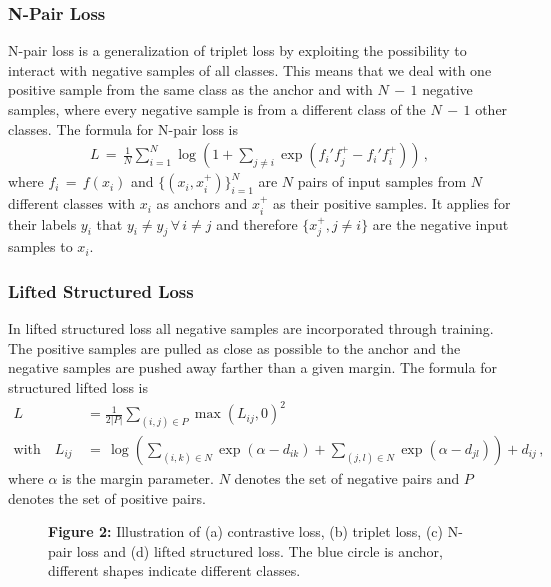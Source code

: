 \documentclass[12pt,paper=a4]{scrartcl}
\theoremstyle{break}
\begin{document}
\subsubsection{N-Pair Loss}
N-pair loss is a generalization of triplet loss by exploiting the possibility to interact with negative samples of all classes. This means that we deal with one positive sample from the same class as the anchor and with $N \, - \, 1$ negative samples, where every negative sample is from a different class of the $N \, - \, 1$ other classes. The formula for N-pair loss is 
\begin{align}
L\, = \, \frac{1}{N}\sum_{i=1}^N\log \left( 1+\sum_{j\neq i}\exp \left( f_i' f_j^+ - f_i' f_i^+\right) \right) \, ,
\end{align}
where $f_i\, = \, f(x_i)$ and $\{(x_i, x_i^+)\}_{i=1}^N$ are $N$ pairs of input samples from $N$ different classes with $x_i$ as anchors and $x_i^+$ as their positive samples. It applies for their labels $y_i$ that $y_i \neq y_j \, \forall \, i\neq j$ and therefore $\{x_j^+, j\neq i\}$ are the negative input samples to $x_i$.
\subsubsection{Lifted Structured Loss}
In lifted structured loss all negative samples are incorporated through training. The positive samples are pulled as close as possible to the anchor and the negative samples are pushed away farther than a given margin. The formula for structured lifted loss is
\begin{align}
L &= \frac{1}{2|P|}\sum_{(i,j)\in P}\max\left(L_{ij}, 0\right)^2 \\
\text{with} \quad L_{ij} \, &= \, \log \left( \sum_{(i,k)\in N} \exp \left( \alpha - d_{ik}\right) + \sum_{(j,l)\in N}\exp \left(\alpha - d_{jl}\right)\right)+d_{ij}\, ,
\end{align}
where $\alpha$ is the margin parameter. $N$ denotes the set of negative pairs and $P$ denotes the set of positive pairs.
\begin{figure}[h]%
  \centering
  \qquad
  \caption{\textbf{Figure 2:} Illustration of (a) contrastive loss, (b) triplet loss, (c) N-pair loss and (d) lifted structured loss. The blue circle is anchor, different shapes indicate different classes.}%
\end{figure}
\end{document}
